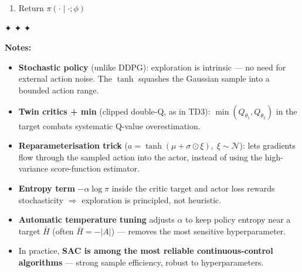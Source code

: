 \documentclass[11pt]{article}
\providecommand{\tightlist}{%
      \setlength{\itemsep}{0pt}\setlength{\parskip}{0pt}}
\begin{document}
\begin{enumerate}
\begin{itemize}
\begin{itemize}
      \[\mathcal{L}(\theta_i) = \frac{1}{B}\sum_j \bigl(y_j - Q_{\theta_i}(s_j, a_j)\bigr)^2,\quad \theta_i \leftarrow \theta_i - \alpha_Q\,\nabla_{\theta_i}\,\mathcal{L}(\theta_i),\quad i=1,2\]
    \item
      \textbf{--- Update actor (reparameterised --- gradient flows
      through sample) ---}
    \item
      Sample
      \(\tilde{a}_j = \tanh(\mu_\phi(s_j) + \sigma_\phi(s_j) \odot \xi_j),\; \xi_j \sim \mathcal{N}(0,I)\)
      \[\mathcal{L}(\phi) = \frac{1}{B}\sum_j \Bigl[\alpha\,\log\pi(\tilde{a}_j \mid s_j;\phi) \;-\; \min_{i=1,2} Q_{\theta_i}(s_j, \tilde{a}_j)\Bigr]\]
      \[\phi \leftarrow \phi - \alpha_\phi\,\nabla_\phi\,\mathcal{L}(\phi)\]
    \item
      \textbf{(Optional) Auto-tune temperature} \(\alpha\) toward target
      entropy \(\bar{H}\):
      \[\mathcal{L}(\alpha) = -\alpha\,\mathbb{E}_{a\sim\pi}\bigl[\log\pi(a \mid s) + \bar{H}\bigr],\qquad \alpha \leftarrow \alpha - \alpha_\alpha\,\nabla_\alpha\,\mathcal{L}(\alpha)\]
    \item
      \textbf{Soft-update target critics:}
      \(\;\theta_i^- \leftarrow \tau\theta_i + (1-\tau)\theta_i^-,\quad i=1,2\)
    \item
      \(s \leftarrow s'\)
    \end{itemize}
  \item
    Until \(s\) is terminal
  \end{itemize}
\item
  Return \(\pi(\cdot \mid \cdot;\phi)\)
\end{enumerate}

✦ ✦ ✦

\textbf{Notes:}

\begin{itemize}
\tightlist
\item
  \textbf{Stochastic policy} (unlike DDPG): exploration is intrinsic ---
  no need for external action noise. The \(\tanh\) squashes the Gaussian
  sample into a bounded action range.
\item
  \textbf{Twin critics + min} (clipped double-Q, as in TD3):
  \(\min(Q_{\theta_1}, Q_{\theta_2})\) in the target combats systematic
  Q-value overestimation.
\item
  \textbf{Reparameterisation trick}
  (\(a = \tanh(\mu + \sigma \odot \xi),\;\xi\sim\mathcal{N}\)): lets
  gradients flow through the sampled action into the actor, instead of
  using the high-variance score-function estimator.
\item
  \textbf{Entropy term} \(-\alpha \log\pi\) inside the critic target and
  actor loss rewards stochasticity \(\Rightarrow\) exploration is
  principled, not heuristic.
\item
  \textbf{Automatic temperature tuning} adjusts \(\alpha\) to keep
  policy entropy near a target \(\bar{H}\) (often \(\bar{H} = -|A|\))
  --- removes the most sensitive hyperparameter.
\item
  In practice, \textbf{SAC is among the most reliable continuous-control
  algorithms} --- strong sample efficiency, robust to hyperparameters.
\end{itemize}
\end{document}
